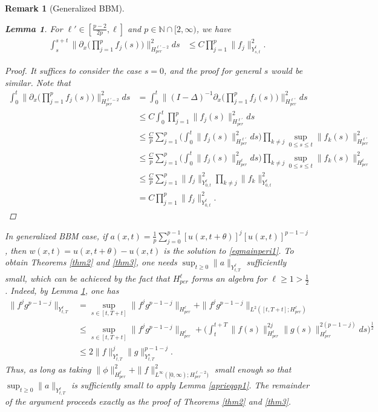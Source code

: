 \documentclass[10pt,a4paper,final]{article}
\numberwithin{equation}{section}
\newtheorem{lemma}[theorem]{Lemma}
\newtheorem{remark}[theorem]{Remark}
\newcommand{\N}{\mathbb{N}}
\newcommand{\Gth}{\theta}
\begin{document}
\begin{remark}[Generalized BBM]
    \begin{lemma} \label{multi2}
        For $\ell'\in [\frac{p-2}{2p},\ell]$ and $p\in \N\cap [2,\infty)$, we have 
        \begin{align*}
            \int_{s}^{s+t} \bigg\|\partial_x\bigg(\prod_{j=1}^p f_j(s)\bigg)\bigg\|_{H^{\ell'-2}_{per}}^2ds &\leq C \prod_{j=1}^p \|f_j\|_{Y^\ell_{s,t}}^2.
        \end{align*}
    \end{lemma}
    \begin{proof}
    It suffices to consider the case $s=0$, and the proof for general $s$ would be similar. Note that
        \begin{align*}
            \int_0^t\bigg\|\partial_x\bigg(\prod_{j=1}^p f_j(s)\bigg)\bigg\|_{H^{\ell'-2}_{per}}^2ds&=\int_0^t\bigg\|(I-\Delta)^{-1}\partial_x\bigg(\prod_{j=1}^p f_j(s)\bigg)\bigg\|_{H^{\ell'}_{per}}^2ds \\&\leq C\int_0^t \prod_{j=1}^{p}\|f_j(s)\|_{H^{\ell'}_{per}}^2 ds \\
            &\leq \frac{C}{p}\sum_{j=1}^p\bigg(\int_0^t\|f_j(s)\|_{H^{\ell'}_{per}}^2ds \bigg)\prod_{k\neq j}\sup_{0\leq s\leq t}\|f_k(s)\|_{H^{\ell'}_{per}}^2 \\
            &\leq \frac{C}{p}\sum_{j=1}^p\bigg(\int_0^t\|f_j(s)\|_{H^{\ell}_{per}}^2ds \bigg)\prod_{k\neq j}\sup_{0\leq s\leq t}\|f_k(s)\|_{H^{\ell}_{per}}^2 \\
            &\leq \frac{C}{p}\sum_{j=1}^{p}\|f_j\|_{Y^{\ell}_{0,t}}^2\prod_{k\neq j}\|f_k\|_{Y^{\ell}_{0,t}}^2\\&= C\prod_{j=1}^{p}\|f_j\|_{Y^\ell_{0,t}}^2.
        \end{align*}
    \end{proof}
    In generalized BBM case, if $a(x,t)=\frac{1}{p}\sum_{j=0}^{p-1} [u(x,t+\Gth)]^{j}[u(x,t)]^{p-1-j}$, then $w(x,t)=u(x,t+\Gth)-u(x,t)$ is the solution to \eqref{eqmainperi1}. To obtain Theorems \ref{thm2} and \ref{thm3}, one needs $\sup_{t\geq 0}\|a\|_{Y^{\ell}_{t,T}}$ sufficiently small, which can be achieved by the fact that $H^\ell_{per}$ forms an algebra for $\ell\geq 1>\frac{1}{2}$. Indeed, by Lemma \ref{multi2}, one has 
    \begin{align*}
        \|f^{j}g^{p-1-j}\|_{Y^{\ell}_{t,T}}&=\sup_{s\in [t,T+t]}\|f^jg^{p-1-j}\|_{H^\ell_{per}}+\|f^jg^{p-1-j}\|_{L^2([t,T+t];H^\ell_{per})}\\
        &\leq \sup_{s\in [t,T+t]}\|f^jg^{p-1-j}\|_{H^\ell_{per}}+\bigg(\int_t^{t+T}\|f(s)\|_{H^\ell_{per}}^{2j}\|g(s)\|_{H^\ell_{per}}^{2(p-1-j)}ds\bigg)^{\frac{1}{2}} \\
        &\leq 2\|f\|_{Y^{s}_{t,T}}^j\|g\|_{Y^s_{t,T}}^{p-1-j}.
    \end{align*}
    Thus, as long as taking $\|\phi\|_{H^{\ell}_{per}}^2+\|f\|_{L^\infty([0,\infty);H^{\ell-2}_{per})}^2$ small enough so that $\sup_{t\geq 0}\|a\|_{Y^{\ell}_{t,T}}$ is sufficiently small to apply Lemma \ref{aprieqap1}. The remainder of the argument proceeds exactly as the proof of Theorems \ref{thm2} and \ref{thm3}.\\
    

\end{remark}
\end{document}
